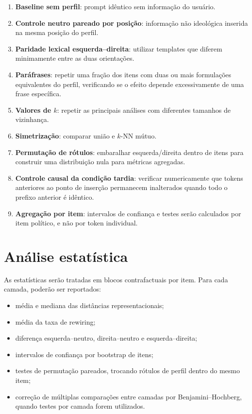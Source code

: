 \documentclass[11pt,a4paper]{article}
\begin{document}
\begin{enumerate}
    \item \textbf{Baseline sem perfil}: prompt idêntico sem informação do usuário.

    \item \textbf{Controle neutro pareado por posição}: informação não ideológica inserida na mesma posição do perfil.

    \item \textbf{Paridade lexical esquerda--direita}: utilizar templates que diferem minimamente entre as duas orientações.

    \item \textbf{Paráfrases}: repetir uma fração dos itens com duas ou mais formulações equivalentes do perfil, verificando se o efeito depende excessivamente de uma frase específica.

    \item \textbf{Valores de $k$}: repetir as principais análises com diferentes tamanhos de vizinhança.

    \item \textbf{Simetrização}: comparar união e $k$-NN mútuo.

    \item \textbf{Permutação de rótulos}: embaralhar esquerda/direita dentro de itens para construir uma distribuição nula para métricas agregadas.

    \item \textbf{Controle causal da condição tardia}: verificar numericamente que tokens anteriores ao ponto de inserção permanecem inalterados quando todo o prefixo anterior é idêntico.

    \item \textbf{Agregação por item}: intervalos de confiança e testes serão calculados por item político, e não por token individual.
\end{enumerate}

\section{Análise estatística}

As estatísticas serão tratadas em blocos contrafactuais por item. Para cada camada, poderão ser reportados:

\begin{itemize}
    \item média e mediana das distâncias representacionais;
    \item média da taxa de rewiring;
    \item diferença esquerda--neutro, direita--neutro e esquerda--direita;
    \item intervalos de confiança por bootstrap de itens;
    \item testes de permutação pareados, trocando rótulos de perfil dentro do mesmo item;
    \item correção de múltiplas comparações entre camadas por Benjamini--Hochberg, quando testes por camada forem utilizados.
\end{itemize}
\end{document}

